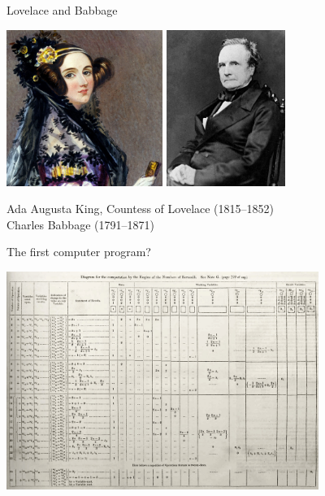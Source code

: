 \documentclass[xcolor={usenames,dvipsnames,svgnames,table},12pt]{beamer}
\begin{document}
\begin{frame}{Lovelace and Babbage}
  \begin{center}
    \includegraphics[height=2in]{ada-lovelace}
    \includegraphics[height=2in]{Babbage}

    Ada Augusta King, Countess of Lovelace (1815--1852)\\
    Charles Babbage (1791--1871)
  \end{center}
\end{frame}

\begin{frame}{The first computer program?}
  \begin{center}
    \includegraphics[width=4in]{lovelace-program}
  \end{center}
\end{frame}
\end{document}
